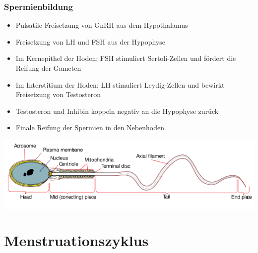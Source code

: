 \documentclass{beamer}
\begin{document}
\begin{frame}
\frametitle{Spermienbildung}

\begin{itemize}
\item
Pulsatile Freisetzung von GnRH aus dem Hypothalamus
\item
Freisetzung von LH und FSH aus der Hypophyse
\pause
\item
Im Kernepithel der Hoden: FSH stimuliert Sertoli-Zellen und fördert die Reifung der Gameten
\item
Im Interstitium der Hoden: LH stimuliert Leydig-Zellen und bewirkt Freisetzung von Testosteron
\pause
\item
Testosteron und Inhibin koppeln negativ an die Hypophyse zurück
\pause
\item
Finale Reifung der Spermien in den Nebenhoden

\end{itemize}

\pause

\begin{center}
\includegraphics[width=\textwidth]{spermium.png}
\end{center}


\end{frame}






\section{Menstruationszyklus}
\end{document}
